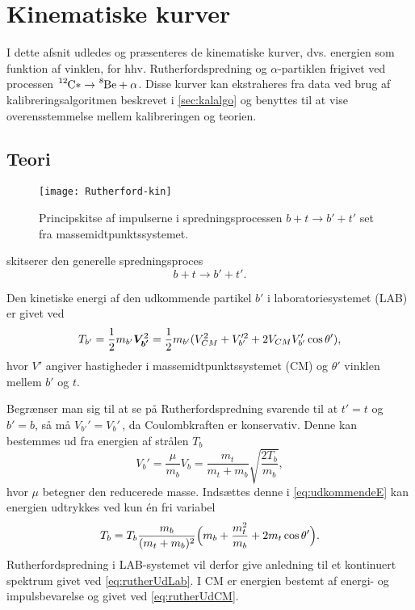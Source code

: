 \chapter{Kinematiske kurver}
\label{cha:rutherford}

I dette afsnit udledes og præsenteres de kinematiske kurver, dvs. energien som funktion af vinklen,
for hhv. Rutherfordspredning og $\alpha$-partiklen frigivet ved processen
$\Carb* \rightarrow \Be + \alpha$. Disse kurver kan ekstraheres fra data ved brug af
kalibreringsalgoritmen beskrevet i \cref{sec:kalalgo} og benyttes til at vise overensstemmelse
mellem kalibreringen og teorien.

\section{Teori}
\label{sec:teori}

\begin{figure}[b]
  \vspace{5mm}
  \centering
  \texttt{[image: Rutherford-kin]}
  \caption{Principskitse af impulserne i spredningsprocessen $b + t \rightarrow b' + t'$ set fra massemidtpunktssystemet.}
  \label{fig:ruther-kin}
  \vspace{-5mm}
\end{figure}

 skitserer den generelle spredningsproces
\begin{equation}
  \label{eq:spredning}
  b + t \rightarrow b' + t'.
\end{equation}

Den kinetiske energi af den udkommende partikel $b'$ i laboratoriesystemet (LAB) er givet ved
\begin{equation}
  \label{eq:udkommendeE}
  T_{b'} = \frac{1}{2}m_{b'} \bm{V_{b'}}^{2} = \frac{1}{2}m_{b'}(V_{CM}^{2} + V_{b'}'^{2} +
  2V_{CM}V_{b'}'\cos \theta' ),
\end{equation}
hvor $V'$ angiver hastigheder i massemidtpunktssystemet (CM) og $\theta'$ vinklen mellem $b'$ og $t$.

Begrænser man sig til at se på Rutherfordspredning svarende til at $t' = t$ og $b' = b$, så må
$V_{b'}' = V_{b}'\,$, da Coulombkraften er konservativ. Denne kan bestemmes ud fra energien af strålen
$T_{b}$
\begin{equation}
  \label{eq:rutherUdCM}
  V_{b}' = \frac{\mu}{m_{b}}V_{b} = \frac{m_{t}}{m_{t}+m_{b}} \sqrt{\frac{2T_{b}}{m_{b}}},
\end{equation}
hvor $\mu$ betegner den reducerede masse. Indsættes denne i \cref{eq:udkommendeE} kan energien
udtrykkes ved kun én fri variabel
\begin{equation}
  \label{eq:rutherUdLab}
  T_{b} = T_{b} \frac{m_{b}}{(m_{t}+m_{b})^{2}} \Bigl(m_{b} + \frac{m_{t}^{2}}{m_{b}} + 2m_{t}\cos \theta'\Bigr).
\end{equation}
Rutherfordspredning i LAB-systemet vil derfor give anledning til et kontinuert spektrum givet ved
\cref{eq:rutherUdLab}. I CM er energien bestemt af energi- og impulsbevarelse og givet ved
\cref{eq:rutherUdCM}.

